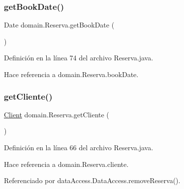 \subsubsection{\texorpdfstring{getBookDate()}{getBookDate()}}
{\footnotesize\ttfamily Date domain.\+Reserva.\+get\+Book\+Date (\begin{DoxyParamCaption}{ }\end{DoxyParamCaption})}



Definición en la línea 74 del archivo Reserva.\+java.


\begin{DoxyCode}{0}

\end{DoxyCode}


Hace referencia a domain.\+Reserva.\+book\+Date.

\mbox{\label{classdomain_1_1_reserva_ac66925fa2326619705c487e27eef46bb}} 
\subsubsection{\texorpdfstring{getCliente()}{getCliente()}}
{\footnotesize\ttfamily \mbox{\hyperlink{classdomain_1_1_client}{Client}} domain.\+Reserva.\+get\+Cliente (\begin{DoxyParamCaption}{ }\end{DoxyParamCaption})}



Definición en la línea 66 del archivo Reserva.\+java.


\begin{DoxyCode}{0}

\end{DoxyCode}


Hace referencia a domain.\+Reserva.\+cliente.



Referenciado por data\+Access.\+Data\+Access.\+remove\+Reserva().

